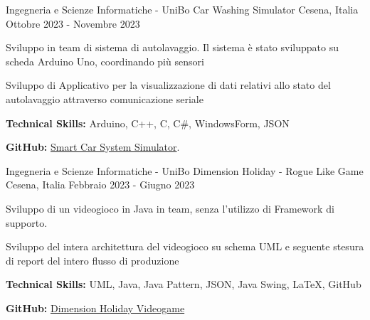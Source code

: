 \begin{cventries}
    \cventry
    {Ingegneria e Scienze Informatiche - UniBo} %
    {Car Washing Simulator} %
    {Cesena, Italia} %
    {Ottobre 2023 - Novembre 2023} %
    {
      \begin{cvitems} %
        \item {Sviluppo in team di sistema di autolavaggio. Il sistema è stato sviluppato su scheda Arduino Uno, coordinando più sensori}
        \item {Sviluppo di Applicativo per la visualizzazione di dati relativi allo stato del autolavaggio attraverso comunicazione seriale}
        \item {\textbf{Technical Skills:} Arduino, C++, C, C\#, WindowsForm, JSON}
        \item {\textbf{GitHub:} \href{https://github.com/elvisperlika/Smart-Car-Washing-System.git}{Smart Car System Simulator}.}
      \end{cvitems}
    }

     \cventry
    {Ingegneria e Scienze Informatiche - UniBo} %
    {Dimension Holiday - Rogue Like Game} %
    {Cesena, Italia} %
    {Febbraio 2023 - Giugno 2023} %
    {
      \begin{cvitems} %
        \item {Sviluppo di un videogioco in Java in team, senza l'utilizzo di Framework di supporto.}
        \item {Sviluppo del intera architettura del videogioco su schema UML e seguente stesura di report del intero flusso di produzione}
        \item {\textbf{Technical Skills:} UML, Java, Java Pattern, JSON, Java Swing, LaTeX, GitHub}
        \item {\textbf{GitHub:} \href{https://github.com/elvisperlika/Dimension-Holiday-Videogame.git}{Dimension Holiday Videogame}}
      \end{cvitems}
    }

\end{cventries}
